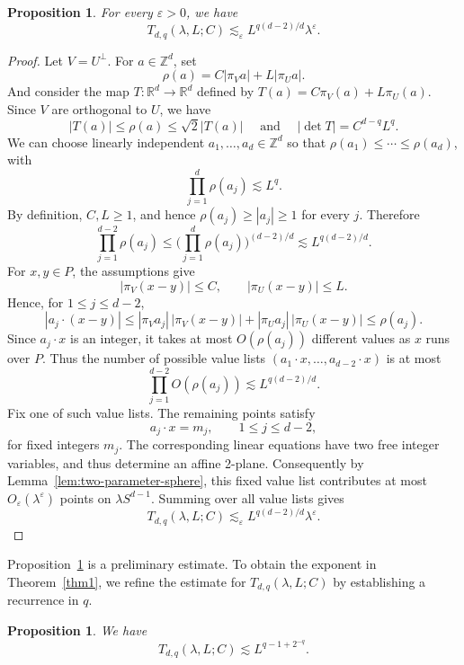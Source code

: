 \documentclass[11pt,reqno]{amsart}
\newtheorem{proposition}[theorem]{Proposition}
\numberwithin{equation}{section}
\newcommand{\1}{\textbf{1}}
\newcommand{\ls}{\lesssim}
\newcommand{\R}{\mathbb R}
\newcommand{\Z}{\mathbb Z}
\newcommand{\eps}{\varepsilon}
\newcommand{\la}{\lambda}
\begin{document}
	\begin{proposition}\label{prop:fibration}
		For every \(\eps>0\), we have
		\[
		T_{d,q}(\la,L;C)\ls_\eps L^{q(d-2)/d}\la^\eps .
		\]
	\end{proposition}
	
	\begin{proof}
		Let $V=U^\perp$. For \(a\in\Z^d\), set
		\[
		\rho(a)=C|\pi_Va|+L|\pi_Ua|.
		\]
		And consider the map \(T:\R^d\to\R^d\) defined by \(T(a)=C\pi_V(a)+L\pi_U(a).\)
		Since $V$ are orthogonal to $U$, we have
		\[
		|T(a)|\le \rho(a)\le \sqrt2 |T(a)| \quad \text{ and } \quad |\det T|=C^{d-q}L^q.
		\]
		We can choose linearly independent \(a_1,\ldots,a_d\in\Z^d\) so that
		\(\rho(a_1)\le\cdots\le\rho(a_d)\), with
		\[
		\prod_{j=1}^d \rho(a_j)\ls L^q.
		\]
		By definition, \(C,L\ge1\), and hence
		\(
		\rho(a_j)\ge |a_j|\ge1
		\)
		for every \(j\). Therefore
		\[
		\prod_{j=1}^{d-2}\rho(a_j)
		\le
		\Big(\prod_{j=1}^{d}\rho(a_j)\Big)^{(d-2)/d}
		\ls L^{q(d-2)/d}.
		\]
		For \(x,y\in P\), the assumptions give
		\[
		|\pi_V(x-y)|\le C,
		\qquad
		|\pi_U(x-y)|\le L.
		\]
		Hence, for \(1\le j\le d-2\),
		\[
		|a_j\cdot(x-y)|
		\le
		|\pi_Va_j|\,|\pi_V(x-y)|
		+
		|\pi_Ua_j|\,|\pi_U(x-y)|
		\le \rho(a_j).
		\]
		Since \(a_j\cdot x\) is an integer, it takes at most \(O(\rho(a_j))\)
		different values as \(x\) runs over \(P\). Thus the number of possible value
		lists
		\(
		(a_1\cdot x,\ldots,a_{d-2}\cdot x)
		\)
		is at most
		\[
		\prod_{j=1}^{d-2}O(\rho(a_j))
		\ls L^{q(d-2)/d}.
		\]
		Fix one of such value lists.  The remaining points satisfy
		\[
		a_j\cdot x=m_j,
		\qquad 1\le j\le d-2,
		\]
		for fixed integers \(m_j\).  The corresponding linear
		equations have two free integer variables, and thus determine an affine 2-plane. Consequently by Lemma~\ref{lem:two-parameter-sphere}, this fixed value list contributes at
		most \(O_\eps(\la^\eps)\) points on \(\la S^{d-1}\).
		Summing over all value lists gives
		\[
		T_{d,q}(\la,L;C)
		\ls_\eps
		L^{q(d-2)/d}\la^\eps.
		\]
	\end{proof}
	
	
	Proposition~\ref{prop:fibration} is a preliminary estimate. To obtain the exponent in Theorem~\ref{thm1}, we refine the estimate for $T_{d,q}(\la,L;C)$ by establishing a recurrence  in $q$.
	\begin{proposition}\label{prop:local}
		We have
		\[
		T_{d,q}(\la,L;C)\ls L^{q-1+2^{-q}}.
		\]
		
	\end{proposition}
	
\end{document}
